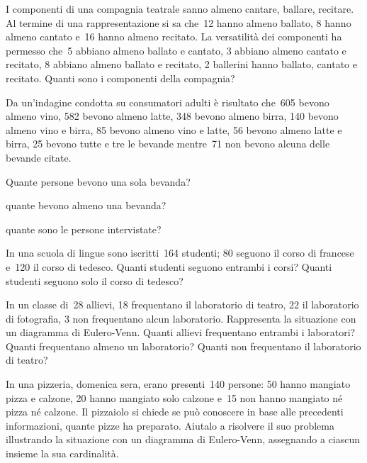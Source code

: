 \begin{multicols}{2}
\begin{esercizio}[\Ast]
\label{ese:\thechapter.81}
I componenti di una compagnia teatrale sanno almeno cantare, ballare,
recitare. Al termine di una rappresentazione si sa che~12 hanno almeno
ballato, 8 hanno almeno cantato e~16 hanno almeno recitato. La
versatilità dei componenti ha permesso che~5 abbiano almeno ballato e
cantato, 3 abbiano almeno cantato e recitato, 8 abbiano almeno ballato e
recitato, 2 ballerini hanno ballato, cantato e recitato. Quanti sono i
componenti della compagnia?
\end{esercizio}

\begin{esercizio}[\Ast]
\label{ese:\thechapter.82}
Da un'indagine condotta su consumatori adulti è
risultato che~605 bevono almeno vino, 582 bevono almeno latte, 348
bevono almeno birra, 140 bevono almeno vino e birra, 85 bevono almeno
vino e latte, 56 bevono almeno latte e birra, 25 bevono tutte e tre le
bevande mentre~71 non bevono alcuna delle bevande citate.
\begin{enumeratea}
\item Quante persone bevono una sola bevanda?
\item quante bevono almeno una bevanda?
\item quante sono le persone intervistate?
\end{enumeratea}
\end{esercizio}

\begin{esercizio}[\Ast]
\label{ese:\thechapter.83}
In una scuola di lingue sono iscritti~164 studenti; 80 seguono il
corso di francese e~120 il corso di tedesco. Quanti studenti seguono
entrambi i corsi? Quanti studenti seguono
solo il corso di tedesco?
\end{esercizio}

\begin{esercizio}
\label{ese:\thechapter.84}
In un classe di~28 allievi, 18 frequentano il laboratorio di teatro,
22 il laboratorio di fotografia, 3 non frequentano alcun laboratorio.
Rappresenta la situazione con un diagramma di Eulero-Venn. Quanti
allievi frequentano entrambi i laboratori? Quanti frequentano almeno un
laboratorio? Quanti non frequentano il laboratorio di teatro?
\end{esercizio}

\begin{esercizio}
\label{ese:\thechapter.85}
In una pizzeria, domenica sera, erano presenti~140 persone: 50 hanno
mangiato pizza e calzone, 20 hanno mangiato solo calzone e~15 non hanno
mangiato né pizza né calzone. Il pizzaiolo si chiede se può
conoscere in base alle precedenti informazioni, quante pizze ha
preparato. Aiutalo a risolvere il suo problema illustrando la
situazione con un diagramma di Eulero-Venn, assegnando a ciascun insieme la
sua cardinalità.
\end{esercizio}


\end{multicols}
